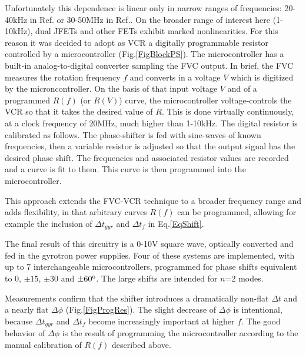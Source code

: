 \documentclass[aps,pra,twocolumn]{revtex4}
\begin{document}
Unfortunately this dependence is linear only in narrow ranges 
of frequencies: 20-40kHz in Ref.\cite{Japan} or 30-50MHz in Ref.\cite{CERN}. 
On the broader range of interest here (1-10kHz), 
dual JFETs and other FETs exhibit marked nonlinearities. 
For this reason 
it was decided to adopt as VCR a digitally programmable resistor 
controlled by a microcontroller (Fig.\ref{FigBlockPS}).  
The microcontroller has a built-in analog-to-digital converter
sampling the FVC output. 
In brief, the FVC measures the rotation frequency $f$ and 
converts in a voltage $V$ which is digitized by the microncontroller. 
On the basis of that input voltage $V$ and of a programmed $R(f)$ (or 
$R(V)$) curve, the microcontroller voltage-controls the VCR so that it 
takes the desired value of $R$. 
This is done virtually continuously, at a clock frequency of 20MHz, much
higher than 1-10kHz. 
The digital resistor is calibrated as follows. 
The phase-shifter is fed with sine-waves of known frequencies,  
then a variable resistor is adjusted so that the output
signal has the desired phase shift. The frequencies and associated resistor
values are recorded and a curve is fit to them.  
This curve is then programmed into the microcontroller.  

This approach extends the FVC-VCR technique to a
broader frequency range and adds flexibility, in that arbitrary curves 
$R(f)$ can be programmed, allowing for example the inclusion of   
$\Delta t_{gyr}$ and $\Delta t_f$ in Eq.\ref{EqShift}. 

The final result of this circuitry is a 0-10V square wave, optically converted 
and fed in the gyrotron power supplies. 
Four of these systems are implemented, with up to 7 interchangeable
microcontrollers, programmed for phase shifts equivalent to 0, $\pm 15$, $\pm
30$ and $\pm 60^{\rm o}$. The large shifts are intended for $n$=2 modes. 

Measurements confirm that the shifter introduces a dramatically non-flat 
$\Delta t$ and a nearly flat $\Delta \phi$ (Fig.\ref{FigProgRes}). 
The slight decrease of $\Delta \phi$ is intentional, because $\Delta t_{gyr}$ 
and $\Delta t_f$ become increasingly important at higher 
$f$. The good behavior of $\Delta \phi$ is the result of 
programming the microcontroller according to the manual calibration of $R(f)$  
described above. 
\end{document}
